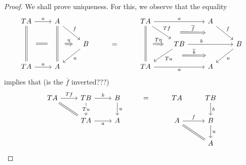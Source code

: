 \documentclass[a4paper,11pt,oneside,openany]{scrbook}
\begin{document}
\begin{proof}
    We shall prove uniqueness. For this, we observe that the equality
    \[\begin{tikzcd}
        TA & A &&& TA && A \\
        && B & {=} && TB && B \\
        TA & A &&& TA && A
        \arrow["a", from=1-1, to=1-2]
        \arrow["f", from=1-2, to=2-3]
        \arrow[""{name=0, anchor=center, inner sep=0}, Rightarrow, no head, from=1-1, to=3-1]
        \arrow[""{name=1, anchor=center, inner sep=0}, Rightarrow, no head, from=1-2, to=3-2]
        \arrow["u", from=2-3, to=3-2]
        \arrow["a", from=3-1, to=3-2]
        \arrow["a"', from=3-5, to=3-7]
        \arrow["a", from=1-5, to=1-7]
        \arrow[""{name=2, anchor=center, inner sep=0}, Rightarrow, no head, from=1-5, to=3-5]
        \arrow[""{name=3, anchor=center, inner sep=0}, "f", from=1-7, to=2-8]
        \arrow[""{name=4, anchor=center, inner sep=0}, "u", from=2-8, to=3-7]
        \arrow["b"{pos=0.3}, from=2-6, to=2-8]
        \arrow[""{name=5, anchor=center, inner sep=0}, "Tf", from=1-5, to=2-6]
        \arrow[""{name=6, anchor=center, inner sep=0}, "Tu", from=2-6, to=3-5]
        \arrow[shorten <=13pt, shorten >=13pt, Rightarrow, no head, from=0, to=1]
        \arrow["T\eta", shorten <=10pt, shorten >=10pt, Rightarrow, from=2, to=2-6]
        \arrow["{\overline{b}}", shorten <=26pt, shorten >=26pt, Rightarrow, from=6, to=4]
        \arrow["{\overline{f}}", shorten <=26pt, shorten >=26pt, Rightarrow, from=5, to=3]
        \arrow["\eta", shorten <=10pt, shorten >=10pt, Rightarrow, from=1, to=2-3]
    \end{tikzcd}\]
    implies that (is the $\overline{f}$ inverted???)
    \[\begin{tikzcd}
        TA & TB & B & {=} & TA & TB \\
        & TA & A && A & B \\
        &&&&& A
        \arrow[""{name=0, anchor=center, inner sep=0}, "u", from=1-3, to=2-3]
        \arrow[""{name=1, anchor=center, inner sep=0}, "Tu"{description}, from=1-2, to=2-2]
        \arrow["Tf", from=1-1, to=1-2]
        \arrow["b", from=1-2, to=1-3]
        \arrow["a"', from=2-2, to=2-3]
        \arrow[""{name=2, anchor=center, inner sep=0}, Rightarrow, no head, from=1-1, to=2-2]
        \arrow[""{name=3, anchor=center, inner sep=0}, Rightarrow, no head, from=2-5, to=3-6]
        \arrow[""{name=4, anchor=center, inner sep=0}, "u", from=2-6, to=3-6]
        \arrow["f", from=2-5, to=2-6]
        \arrow[""{name=5, anchor=center, inner sep=0}, "b", from=1-6, to=2-6]

\end{tikzcd}\]
\end{proof}
\end{document}

